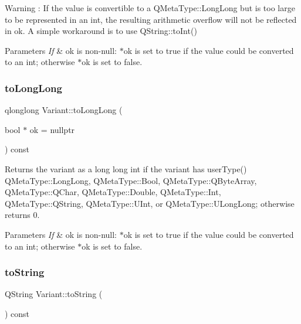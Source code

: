 \begin{DoxyWarning}{Warning}
\+: If the value is convertible to a Q\+Meta\+Type\+::\+Long\+Long but is too large to be represented in an int, the resulting arithmetic overflow will not be reflected in ok. A simple workaround is to use Q\+String\+::to\+Int() 
\end{DoxyWarning}

\begin{DoxyParams}{Parameters}
{\em If} & ok is non-\/null\+: $\ast$ok is set to true if the value could be converted to an int; otherwise $\ast$ok is set to false. \\
\hline
\end{DoxyParams}
\mbox{\label{class_variant_ad6c7084a71cb3189d302160a160bb36b}} 
\subsubsection{\texorpdfstring{to\+Long\+Long}{toLongLong}}
{\footnotesize\ttfamily qlonglong Variant\+::to\+Long\+Long (\begin{DoxyParamCaption}\item[{bool $\ast$}]{ok = {\ttfamily nullptr} }\end{DoxyParamCaption}) const\hspace{0.3cm}{\ttfamily [slot]}}



Returns the variant as a long long int if the variant has user\+Type() Q\+Meta\+Type\+::\+Long\+Long, Q\+Meta\+Type\+::\+Bool, Q\+Meta\+Type\+::\+Q\+Byte\+Array, Q\+Meta\+Type\+::\+Q\+Char, Q\+Meta\+Type\+::\+Double, Q\+Meta\+Type\+::\+Int, Q\+Meta\+Type\+::\+Q\+String, Q\+Meta\+Type\+::\+U\+Int, or Q\+Meta\+Type\+::\+U\+Long\+Long; otherwise returns 0. 


\begin{DoxyParams}{Parameters}
{\em If} & ok is non-\/null\+: $\ast$ok is set to true if the value could be converted to an int; otherwise $\ast$ok is set to false. \\
\hline
\end{DoxyParams}
\mbox{\label{class_variant_a72d36925a5a47a1138a339cd4c4d3feb}} 
\subsubsection{\texorpdfstring{to\+String}{toString}}
{\footnotesize\ttfamily Q\+String Variant\+::to\+String (\begin{DoxyParamCaption}{ }\end{DoxyParamCaption}) const\hspace{0.3cm}{\ttfamily [slot]}}



